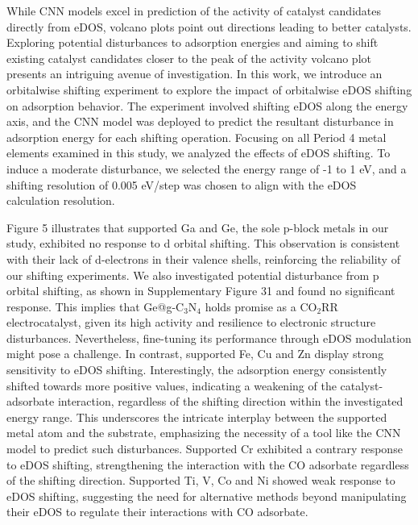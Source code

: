 While CNN models excel in prediction of the activity of catalyst candidates directly from eDOS, volcano plots point out directions leading to better catalysts.
Exploring potential disturbances to adsorption energies and aiming to shift existing catalyst candidates closer to the peak of the activity volcano plot presents an intriguing avenue of investigation.
In this work, we introduce an orbitalwise shifting experiment to explore the impact of orbitalwise eDOS shifting on adsorption behavior.
The experiment involved shifting eDOS along the energy axis, and the CNN model was deployed to predict the resultant disturbance in adsorption energy for each shifting operation.
Focusing on all Period 4 metal elements examined in this study, we analyzed the effects of eDOS shifting.
To induce a moderate disturbance, we selected the energy range of -1 to 1 eV, and a shifting resolution of 0.005 eV/step was chosen to align with the eDOS calculation resolution.

Figure 5 illustrates that supported Ga and Ge, the sole p-block metals in our study, exhibited no response to d orbital shifting.
This observation is consistent with their lack of d-electrons in their valence shells, reinforcing the reliability of our shifting experiments.
We also investigated potential disturbance from p orbital shifting, as shown in Supplementary Figure 31 and found no significant response.
This implies that Ge@g-C$_3$N$_4$ holds promise as a CO$_2$RR electrocatalyst, given its high activity and resilience to electronic structure disturbances.
Nevertheless, fine-tuning its performance through eDOS modulation might pose a challenge.
In contrast, supported Fe, Cu and Zn display strong sensitivity to eDOS shifting.
Interestingly, the adsorption energy consistently shifted towards more positive values, indicating a weakening of the catalyst-adsorbate interaction, regardless of the shifting direction within the investigated energy range.
This underscores the intricate interplay between the supported metal atom and the substrate, emphasizing the necessity of a tool like the CNN model to predict such disturbances.
Supported Cr exhibited a contrary response to eDOS shifting, strengthening the interaction with the CO adsorbate regardless of the shifting direction.
Supported Ti, V, Co and Ni showed weak response to eDOS shifting, suggesting the need for alternative methods beyond manipulating their eDOS to regulate their interactions with CO adsorbate.

